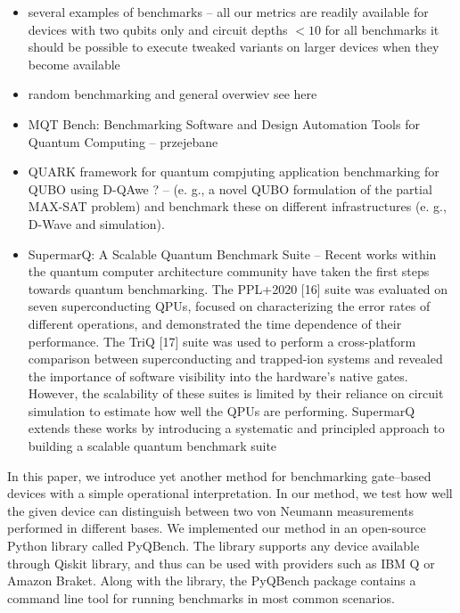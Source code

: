 \documentclass[preprint,12pt, a4paper, dvipsnames]{elsarticle}
\newcommand{\1}{{\rm 1\hspace{-0.9mm}l}}
\begin{document}
\begin{itemize}
	\item several examples of benchmarks -- all our metrics are readily available for devices with two qubits only and circuit depths $< 10$  for all benchmarks it should be possible to execute
	tweaked variants on larger devices when they become available \cite{cornelissen2021scalable}
	\item random benchmarking \cite{liu2022sampling, knill2007randomized, wallman2014randomized} and general overwiev see here \cite{helsen2022general}
	\item MQT Bench: Benchmarking Software and
	Design Automation Tools for Quantum Computing \cite{mqt2022} -- przejebane 
	\item QUARK framework for quantum compjuting application benchmarking for QUBO using D-QAwe ? \cite{quark2022} --  (e. g., a novel QUBO formulation
	of the partial MAX-SAT problem) and benchmark these on
	different infrastructures (e. g., D-Wave and simulation). 
	\item SupermarQ: A Scalable Quantum Benchmark Suite -- Recent works within the quantum computer architecture
	community have taken the first steps towards quantum
	benchmarking. The PPL+2020 [16] suite was evaluated on
	seven superconducting QPUs, focused on characterizing the
	error rates of different operations, and demonstrated the
	time dependence of their performance. The TriQ [17] suite
	was used to perform a cross-platform comparison between
	superconducting and trapped-ion systems and revealed the
	importance of software visibility into the hardware’s native
	gates. However, the scalability of these suites is limited by
	their reliance on circuit simulation to estimate how well the
	QPUs are performing. SupermarQ extends these works by
	introducing a systematic and principled approach to building
	a scalable quantum benchmark suite \cite{supermarq2022}

\end{itemize}

In this paper, we introduce yet another method for benchmarking gate--based devices with a simple
operational interpretation. In our method, we test how well the given device can distinguish between
two von Neumann measurements performed in different bases. We implemented our method in an
open-source Python library called PyQBench. The library supports any device available through Qiskit
library, and thus can be used with providers such as IBM Q or Amazon Braket. Along with the library,
the PyQBench package contains a command line tool for running benchmarks in most common scenarios.
\end{document}
